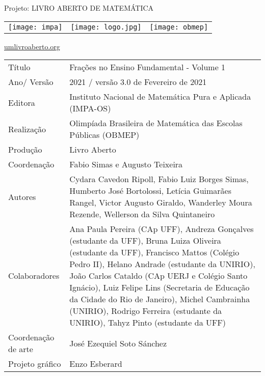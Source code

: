 
\thispagestyle{empty}
{\small


\begin{center}
Projeto: LIVRO ABERTO DE MATEMÁTICA

\begin{tabular}{m{.25\linewidth}m{.25\linewidth}m{.25\linewidth}}
\texttt{[image: impa]} & \texttt{[image: logo.jpg]} & \texttt{[image: obmep]}
\end{tabular}

\url{umlivroaberto.org}

\vfill
\renewcommand{\arraystretch}{1.325}

\begin{tabular}{p{}p{}}
Título & Frações no Ensino Fundamental - Volume 1\\
Ano/ Versão & 2021 / versão 3.0 de Fevereiro de 2021 \\

Editora & Instituto Nacional de Matem\'atica Pura e Aplicada (IMPA-OS)\\
Realização& Olimp\'iada Brasileira de Matem\'atica das Escolas P\'ublicas (OBMEP)\\
Produção& Livro Aberto\\

Coordenação & Fabio Simas e Augusto Teixeira\\

Autores & Cydara Cavedon Ripoll, Fabio Luiz Borges Simas, Humberto José Bortolossi, Letícia Guimarães Rangel, Victor Augusto Giraldo, Wanderley Moura Rezende, Wellerson  da Silva Quintaneiro\\

Colaboradores & Ana Paula Pereira (CAp UFF), Andreza Gonçalves (estudante da UFF), Bruna Luiza Oliveira (estudante da UFF), Francisco Mattos (Colégio Pedro II), Helano Andrade (estudante da UNIRIO), João Carlos Cataldo (CAp UERJ e Colégio Santo Ignácio), Luiz Felipe Lins (Secretaria de Educação da Cidade do Rio de Janeiro), Michel Cambrainha (UNIRIO), Rodrigo Ferreira (estudante da UNIRIO), Tahyz Pinto (estudante da UFF) \\

Coordenação \newline de arte  & José Ezequiel Soto Sánchez \\

Projeto gráfico & Enzo Esberard \\


\end{tabular}
\end{center}}

